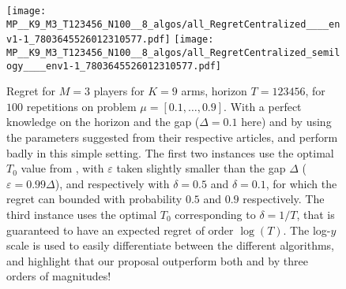 \begin{figure}[!t]
  \centering
      \texttt{[image: MP\_\_K9\_M3\_T123456\_N100\_\_8\_algos/all\_RegretCentralized\_\_\_\_env1-1\_7803645526012310577.pdf]}
      \texttt{[image: MP\_\_K9\_M3\_T123456\_N100\_\_8\_algos/all\_RegretCentralized\_semilogy\_\_\_\_env1-1\_7803645526012310577.pdf]}
  \caption[Regret for $M=3$ players for $K=9$ arms, horizon $T=123456$, for $100$ repetitions on a fixed problem]{Regret for $M=3$ players for $K=9$ arms, horizon $T=123456$, for $100$ repetitions on problem $\mu=[0.1,\dots,0.9]$. With a perfect knowledge on the horizon and the gap ($\Delta=0.1$ here) and by using the parameters suggested from their respective articles, \MEGA{} and \MusicalChair{} perform badly in this simple setting. The first two \MusicalChair{} instances use the optimal $T_0$ value from \cite{Rosenski16}, with $\varepsilon$ taken slightly smaller than the gap $\Delta$ ($\varepsilon=0.99 \Delta$), and respectively with $\delta=0.5$ and $\delta=0.1$, for which the regret can bounded with probability $0.5$ and $0.9$ respectively. The third instance uses the optimal $T_0$ corresponding to $\delta=1/T$, that is guaranteed to have an expected regret of order $\log(T)$. The log-$y$ scale is used to easily differentiate between the different algorithms, and highlight that our proposal outperform both \MEGA{} and \MusicalChair{} by three orders of magnitudes!}
  \label{fig:5:MP__K9_M3_T123456_N100__8_algos}
\end{figure}



